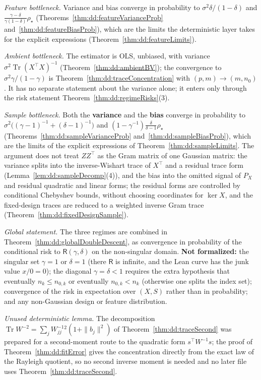 \begin{remark}\label{rmk:dd:remaining}
\emph{Feature bottleneck.} Variance and bias converge in probability to $\sigma^2\delta/(1-\delta)$ and $\frac{\gamma-\delta}{\gamma(1-\delta)}\rho_\star$ (Theorems~\ref{thm:dd:featureVarianceProb} and~\ref{thm:dd:featureBiasProb}), which are the limits
the deterministic layer takes for the explicit expressions (Theorem~\ref{thm:dd:featureLimits}).

\emph{Ambient bottleneck.} The estimator is OLS, unbiased, with variance $\sigma^2\operatorname{Tr}(X^\top X)^{-1}$ (Theorem~\ref{thm:dd:ambientBV}); the convergence to $\sigma^2\gamma/(1-\gamma)$ is
Theorem~\ref{thm:dd:traceConcentration} with $(p,m)\to(m,n_0)$. It has no separate statement about the variance alone; it enters only through the risk statement Theorem~\ref{thm:dd:regimeRisks}(3).

\emph{Sample bottleneck.} Both the \textbf{variance} and the \textbf{bias} converge in probability to $\sigma^2\bigl((\gamma-1)^{-1}+(\delta-1)^{-1}\bigr)$ and $(1-\gamma^{-1})\frac{\delta}{\delta-1}\rho_\star$ (Theorems~\ref{thm:dd:sampleVarianceProb} and~\ref{thm:dd:sampleBiasProb}), which are the limits of the explicit expressions of Theorem~\ref{thm:dd:sampleLimits}. The argument does not treat $ZZ^\top$ as the Gram matrix of one Gaussian matrix: the variance splits into the inverse-Wishart trace of $X^\top$ and a residual trace form (Lemma~\ref{lem:dd:sampleDecomp}(4)), and the bias into the omitted signal of $P_X$ and residual quadratic and linear forms;
the residual forms are controlled by conditional Chebyshev bounds, without choosing coordinates for $\ker X$, and the fixed-design traces are reduced to a weighted inverse Gram trace (Theorem~\ref{thm:dd:fixedDesignSample}).

\emph{Global statement.} The three regimes are combined in Theorem~\ref{thm:dd:globalDoubleDescent}, as convergence in probability of the conditional risk to $\mathsf R(\gamma,\delta)$ on the non-singular domain. \textbf{Not formalized:} the singular set $\gamma=1$ or $\delta=1$ (there $\mathsf R$ is infinite, and the Lean curve has the junk value $x/0=0$); the diagonal $\gamma=\delta<1$ requires the extra hypothesis that eventually $n_k\le n_{0,k}$ or eventually $n_{0,k}<n_k$ (otherwise one splits the index set);
convergence of the risk in expectation over $(X,S)$ rather than in probability; and any non-Gaussian design or feature distribution.

\emph{Unused deterministic lemma.} The decomposition $\operatorname{Tr}W^{-2}=\sum_jW^{-1}_{jj}{}^2(1+\|b_j\|^2)$ of Theorem~\ref{thm:dd:traceSecond} was prepared for a second-moment route to the quadratic form $s^\top W^{-1}s$; the proof of Theorem~\ref{thm:dd:fitError} gives
the concentration directly from the exact law of the Rayleigh quotient, so no second inverse moment is needed and no later file uses Theorem~\ref{thm:dd:traceSecond}.
\end{remark}

